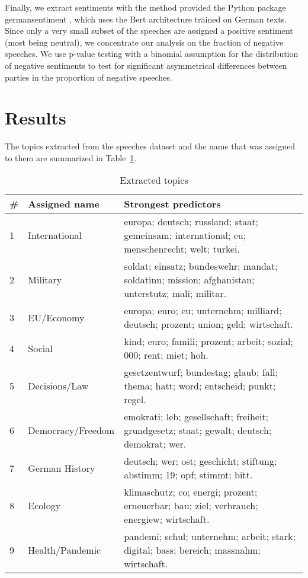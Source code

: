 \documentclass{article}
\begin{document}
Finally, we extract sentiments with the method provided the Python package germansentiment \cite{Germansentiment}, which uses the Bert architecture trained on German texts.
Since only a very small subset of the speeches are assigned a positive sentiment (most being neutral), we concentrate our analysis on the fraction of negative speeches.
We use p-value testing with a binomial assumption for the distribution of negative sentiments to test for significant asymmetrical differences between parties in the proportion of negative speeches.

\section{Results}
The topics extracted from the speeches dataset and the name that was assigned to them are summarized in Table~\ref{topics_table}.
\begin{table}
  \caption{Extracted topics}
  \label{topics_table}
  \centering
  \begin{tabular}{p{0.02\linewidth} | p{0.2\linewidth} | p{0.78\linewidth}}
    \toprule
    \# & Assigned name & Strongest predictors \\
    \midrule
    1 & International & europa; deutsch; russland; staat; gemeinsam; international; eu; menschenrecht; welt; turkei. \\
    2 & Military & soldat; einsatz; bundeswehr; mandat; soldatinn; mission; afghanistan; unterstutz; mali; militar. \\
    3 & EU/Economy & europa; euro; eu; unternehm; milliard; deutsch; prozent; union; geld; wirtschaft. \\
    4 & Social & kind; euro; famili; prozent; arbeit; sozial; 000; rent; miet; hoh. \\
    5 & Decisions/Law & gesetzentwurf; bundestag; glaub; fall; thema; hatt; word; entscheid; punkt; regel. \\
    6 & Democracy/Freedom & emokrati; leb; gesellschaft; freiheit; grundgesetz; staat; gewalt; deutsch; demokrat; wer. \\
    7 & German History & deutsch; wer; ost; geschicht; stiftung; abstimm; 19; opf; stimmt; bitt. \\
    8 & Ecology & klimaschutz; co; energi; prozent; erneuerbar; bau; ziel; verbrauch; energiew; wirtschaft. \\
    9 & Health/Pandemic & pandemi; schul; unternehm; arbeit; stark; digital; bass; bereich; massnahm; wirtschaft. \\
    \bottomrule
  \end{tabular}
\end{table}
\end{document}
